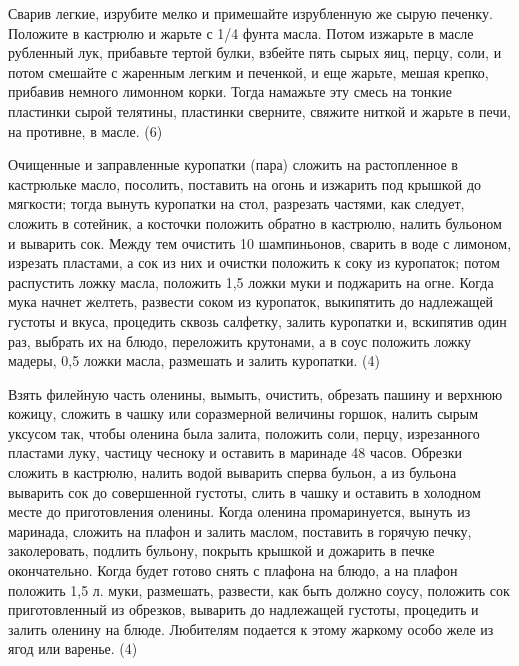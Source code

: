 Сварив легкие, изрубите мелко и примешайте изрубленную же сырую печенку. Положите в кастрюлю и жарьте с 1/4 фунта масла. Потом изжарьте в масле рубленный лук, прибавьте тертой булки, взбейте пять сырых яиц, перцу, соли, и потом смешайте с жаренным легким и печенкой, и еще жарьте, мешая крепко, прибавив немного лимонном корки. Тогда намажьте эту смесь на тонкие пластинки сырой телятины, пластинки сверните, свяжите ниткой и жарьте в печи, на противне, в масле. (6) 


Очищенные и заправленные куропатки (пара) сложить на растопленное в кастрюльке масло, посолить, поставить на огонь и изжарить под крышкой до мягкости; тогда вынуть куропатки на стол, разрезать частями, как следует, сложить в сотейник, а косточки положить обратно в кастрюлю, налить бульоном и выварить сок. Между тем очистить 10 шампиньонов, сварить в воде с лимоном, изрезать пластами, а сок из них и очистки положить к соку из куропаток; потом распустить ложку масла, положить 1,5 ложки муки и поджарить на огне. Когда мука начнет желтеть, развести соком из куропаток, выкипятить до надлежащей густоты и вкуса, процедить сквозь салфетку, залить куропатки и, вскипятив один раз, выбрать их на блюдо, переложить крутонами, а в соус положить ложку мадеры, 0,5 ложки масла, размешать и залить куропатки. (4) 


Взять филейную часть оленины, вымыть, очистить, обрезать пашину и верхнюю кожицу, сложить в чашку или соразмерной величины горшок, налить сырым уксусом так, чтобы оленина была залита, положить соли, перцу, изрезанного пластами луку, частицу чесноку и оставить в маринаде 48 часов. Обрезки сложить в кастрюлю, налить водой выварить сперва бульон, а из бульона выварить сок до совершенной густоты, слить в чашку и оставить в холодном месте до приготовления оленины. Когда оленина промаринуется, вынуть из маринада, сложить на плафон и залить маслом, поставить в горячую печку, заколеровать, подлить бульону, покрыть крышкой и дожарить в печке окончательно. Когда будет готово снять с плафона на блюдо, а на плафон положить 1,5 л. муки, размешать, развести, как быть должно соусу, положить сок приготовленный из обрезков, выварить до надлежащей густоты, процедить и залить оленину на блюде. Любителям подается к этому жаркому особо желе из ягод или варенье. (4) 


